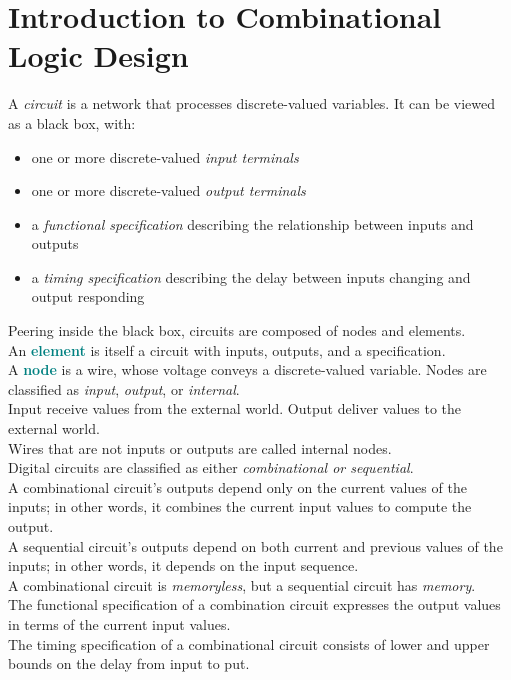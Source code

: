 \documentclass[12pt]{article}
\theoremstyle{definition}
\newcommand{\defnterm}[1]{\textbf{\textcolor{teal}{#1}}\index{#1}}
\begin{document}
  \newpage
  \section{Introduction to Combinational Logic Design}
  A \emph{circuit} is a network that processes discrete-valued variables.
  It can be viewed as a black box, with:
  \begin{itemize}
    \item one or more discrete-valued \emph{input terminals}
    \item one or more discrete-valued \emph{output terminals}
    \item a \emph{functional specification} describing the relationship between inputs and outputs
    \item a \emph{timing specification} describing the delay between inputs changing and output responding
  \end{itemize}
  Peering inside the black box, circuits are composed of nodes and elements. \\
  An \defnterm{element} is itself a circuit with inputs, outputs, and a specification. \\
  A \defnterm{node} is a wire, whose voltage conveys a discrete-valued variable.
  Nodes are classified as \emph{input}, \emph{output}, or \emph{internal}. \\
  Input receive values from the external world. Output deliver values to the external world. \\
  Wires that are not inputs or outputs are called internal nodes. \\

  Digital circuits are classified as either \emph{combinational \emph{or} sequential}. \\
  A combinational circuit's outputs depend only on the current values of the inputs; in other words, it combines the current input values to compute the output. \\
  A sequential circuit's outputs depend on both current and previous values of the inputs; in other words, it depends on the input sequence. \\
  A combinational circuit is \emph{memoryless}, but a sequential circuit has \emph{memory}. \\

  The functional specification of a combination circuit expresses the output values in terms of the current input values. \\
  The timing specification of a combinational circuit consists of lower and upper bounds on the delay from input to put. \\
\end{document}
